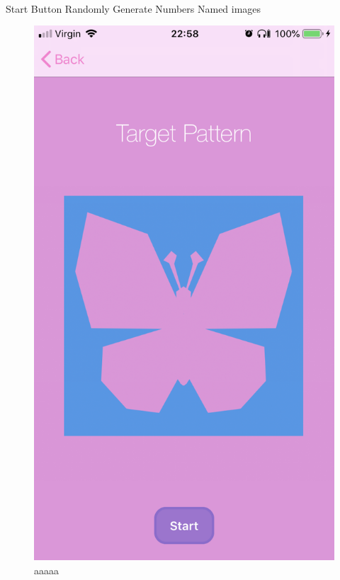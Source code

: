 \documentclass[11pt]{article}
\begin{document}
            \paragraph{}
            Start Button
             Randomly Generate Numbers
             Named images

    
            \begin{figure}[!ht]
                        \begin{minipage}{0.45\textwidth}
                            \centering \includegraphics[width=0.7\linewidth]{KiriZen/simpleTarget.png}
                            \caption{aaaaa}
                            \label{fig:kiriZen-simpleTarget}
                        \end{minipage}\hfill
                        \begin{minipage}{0.45\textwidth}
                            \centering

\end{minipage}
\end{figure}
\end{document}
